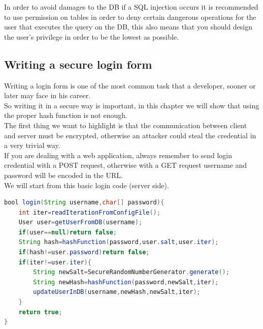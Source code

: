 In order to avoid damages to the DB if a SQL injection occurs it is recommended to use permission on tables in order to deny certain dangerous operations
for the user that executes the query on the DB, this also means that you should design the user's privilege in order to be the lowest as possible.\\ 


\subsection{Writing a secure login form}
Writing a login form is one of the most common task that a developer, sooner or later may face in his career.\\
So writing it in a secure way is important, in this chapter we will show that using the proper hash function is not enough.\\
The first thing we want to highlight is that the communication between client and server must be encrypted, otherwise an attacker could steal the credential in a very trivial way.\\
If you are dealing with a web application, always remember to send login credential with a POST request, otherwise with a GET request username and password will be encoded in the URL.\\
We will start from this basic login code (server side).\\
\begin{lstlisting}[language=Java]
bool login(String username,char[] password){
	int iter=readIterationFromConfigFile();
	User user=getUserFromDB(username);
	if(user==null)return false;
	String hash=hashFunction(password,user.salt,user.iter);
	if(hash!=user.password)return false;
	if(iter!=user.iter){
		String newSalt=SecureRandomNumberGenerator.generate();
		String newHash=hashFunction(password,newSalt,iter);
		updateUserInDB(username,newHash,newSalt,iter);
	}
	return true;
}
\end{lstlisting}



